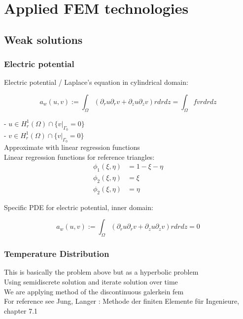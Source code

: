 \documentclass[parskip=half, titlepage=yes, 12pt, BCOR=12mm, DIV=calc]{scrartcl}
\begin{document}
\section{Applied FEM technologies}

\subsection{Weak solutions}
\subsubsection{Electric potential}

Electric potential / Laplace's equation in cylindrical domain:

\begin{equation}
    a_w(u,v) := \int_{\Omega} (\partial_r u \partial_r v + \partial_z u \partial_z v) r drdz = \int_{\Omega} f v r dr dz
\end{equation}

- $u \in H_r^1(\Omega) \cap \{v|_{\Gamma_{0}} = 0 \} $ \\
- $v \in H_r^1(\Omega) \cap \{v|_{\Gamma_{0}} = 0 \} $ \\

Approximate with linear regression functions\\
Linear regression functions for reference triangles:
\begin{align}
    \phi_1(\xi, \eta) &= 1 - \xi - \eta \\
    \phi_2(\xi, \eta) &= \xi \\
    \phi_2(\xi, \eta) &= \eta 
\end{align}

Specific PDE for electric potential, inner domain: 

\begin{equation}
    a_w(u,v) := \int_{\Omega} (\partial_r u \partial_r v + \partial_z u \partial_z v) r drdz = 0 
\end{equation}

\subsubsection{Temperature Distribution}

This is basically the problem above but as a hyperbolic problem \\
Using semidiscrete solution and iterate solution over time \\
We are applying method of the discontinuous galerkein fem \\
For reference see Jung, Langer : Methode der finiten Elemente für Ingenieure, chapter 7.1 \\
\end{document}
